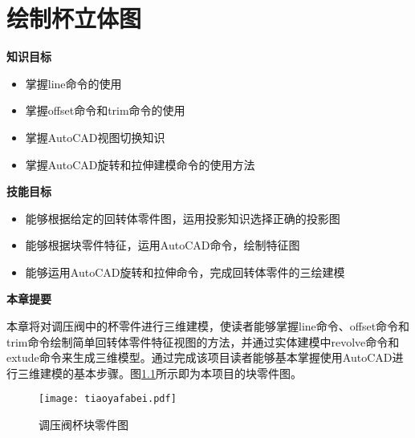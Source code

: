 \chapter{绘制杯立体图}
{\bfseries 知识目标}
\begin{itemize}
\item 掌握line命令的使用
\item 掌握offset命令和trim命令的使用
\item 掌握AutoCAD视图切换知识
\item 掌握AutoCAD旋转和拉伸建模命令的使用方法
\end{itemize}

{\bfseries 技能目标}
\begin{itemize}
\item 能够根据给定的回转体零件图，运用投影知识选择正确的投影图
\item 能够根据块零件特征，运用AutoCAD命令，绘制特征图
\item 能够运用AutoCAD旋转和拉伸命令，完成回转体零件的三绘建模
\end{itemize}

{\bfseries 本章提要}

本章将对调压阀中的杯零件进行三维建模，使读者能够掌握line命令、offset命令和trim命令绘制简单回转体零件特征视图的方法，并通过实体建模中revolve命令和extude命令来生成三维模型。通过完成该项目读者能够基本掌握使用AutoCAD进行三维建模的基本步骤。图\ref{fig:tiaoyafabei}所示即为本项目的块零件图。
\noindent
\begin{figure}[htbp]
\centering
\texttt{[image: tiaoyafabei.pdf]}
\caption{调压阀杯块零件图}\label{fig:tiaoyafabei}
\end{figure}
\endinput